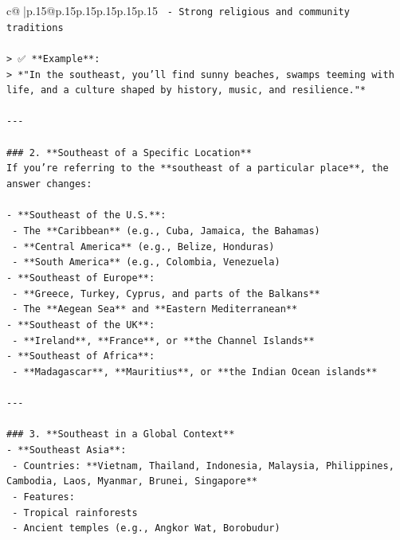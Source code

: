\documentclass{article}
\begin{document}
{\begin{supertabular}{c@{$\;$}|p{.15\linewidth}@{}p{.15\linewidth}p{.15\linewidth}p{.15\linewidth}p{.15\linewidth}p{.15\linewidth}}
{{{\texttt{  {-} Strong religious and community traditions} \\
\\ 
\texttt{> ✅ **Example**:  } \\
\texttt{> *"In the southeast, you’ll find sunny beaches, swamps teeming with life, and a culture shaped by history, music, and resilience."*} \\
\\ 
\texttt{{-}{-}{-}} \\
\\ 
\texttt{\#\#\# 2. **Southeast of a Specific Location**  } \\
\texttt{If you're referring to the **southeast of a particular place**, the answer changes:} \\
\\ 
\texttt{{-} **Southeast of the U.S.**:  } \\
\texttt{  {-} The **Caribbean** (e.g., Cuba, Jamaica, the Bahamas)  } \\
\texttt{  {-} **Central America** (e.g., Belize, Honduras)  } \\
\texttt{  {-} **South America** (e.g., Colombia, Venezuela)} \\
\texttt{{-} **Southeast of Europe**:  } \\
\texttt{  {-} **Greece, Turkey, Cyprus, and parts of the Balkans**  } \\
\texttt{  {-} The **Aegean Sea** and **Eastern Mediterranean**} \\
\texttt{{-} **Southeast of the UK**:  } \\
\texttt{  {-} **Ireland**, **France**, or **the Channel Islands**} \\
\texttt{{-} **Southeast of Africa**:  } \\
\texttt{  {-} **Madagascar**, **Mauritius**, or **the Indian Ocean islands**} \\
\\ 
\texttt{{-}{-}{-}} \\
\\ 
\texttt{\#\#\# 3. **Southeast in a Global Context**  } \\
\texttt{{-} **Southeast Asia**:  } \\
\texttt{  {-} Countries: **Vietnam, Thailand, Indonesia, Malaysia, Philippines, Cambodia, Laos, Myanmar, Brunei, Singapore**  } \\
\texttt{  {-} Features:  } \\
\texttt{    {-} Tropical rainforests  } \\
\texttt{    {-} Ancient temples (e.g., Angkor Wat, Borobudur)  } \\
}}}
\end{supertabular}}
\end{document}
